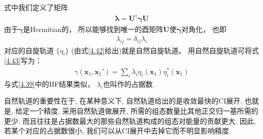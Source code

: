 式中我们定义了矩阵
\begin{align}
\bm{\lambda} = \mathbf{U^\dagger}\bm{\gamma}\mathbf{U}
\end{align}
由于$\bm{\gamma}$是Hermitian的，
所以能够找到唯一的酉矩阵$\mathbf{U}$使$\bm{\gamma}$对角化，
也即
\begin{align}
\lambda_{ij} = \delta_{ij}\lambda_i
\end{align}
对应的自旋轨道 $\{\eta_i\}$ (由式\eqref{4.42}给出)就是自然自旋轨道。
用自然自旋轨道可将式\eqref{4.43}写为：
\begin{align}
\gamma(\mathbf{x}_1,\mathbf{x}_1') = \sum_i \lambda_i \eta_i(\mathbf{x}_1) \eta_i^*(\mathbf{x}_1)
\end{align}
与式\eqref{4.39}中的HF结果类似，
$\lambda_i$也叫作的占据数.


自然轨道的重要性在于, 
在某种意义下, 
自然轨道给出的是收敛最快的CI展开. 
也就是, 
给定一个精度, 
采用自然轨道做展开, 
所需的组态数量比其他正交归一基所需的更少. 
而且往往是占据数最大的那些自然轨道构成的组态对能量的贡献更大. 
因此, 
若某个对应的占据数很小, 
我们可以从CI展开中去掉它而不明显影响精度.


